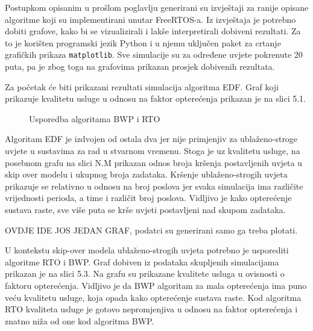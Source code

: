 \documentclass[../zavrsni.tex]{subfiles}
\begin{document}
Postupkom opisanim u prošlom poglavlju generirani su izvještaji za ranije opisane algoritme koji su implementirani unutar FreeRTOS-a.
Iz izvještaja je potrebno dobiti grafove, kako bi se vizualizirali i lakše interpretirali dobiveni rezultati. 
Za to je korišten programski jezik Python i u njemu uključen paket za crtanje grafičkih prikaza \texttt{matplotlib}. 
Sve simulacije su za određene uvjete pokrenute 20 puta, pa je zbog toga na grafovima prikazan prosjek dobivenih rezultata. 

Za početak će biti prikazani rezultati simulacija algoritma EDF. Graf koji prikazuje kvalitetu usluge u odnosu na faktor opterećenja 
prikazan je na slici 5.1. 
\begin{figure}[!htb]
    \caption{\label{fig:my-label} Usporedba algoritama BWP i RTO}
\end{figure}
Algoritam EDF je izdvojen od ostala dva jer nije primjenjiv za ublaženo-stroge
uvjete u sustavima za rad u stvarnom vremenu. Stoga je uz kvalitetu usluge, na posebnom grafu na slici N.M prikazan odnos broja kršenja 
postavljenih uvjeta u skip over modelu i ukupnog broja zadataka. Kršenje ublaženo-strogih uvjeta prikazuje se relativno u odnosu na broj 
poslova jer svaka simulacija ima različite vrijednosti perioda, a time i različit broj poslova.
Vidljivo je kako opterećenje sustava raste, sve više puta se krše uvjeti postavljeni nad 
skupom zadataka.

OVDJE IDE JOS JEDAN GRAF, podatci su generirani samo ga treba plotati.

U kontekstu skip-over modela ublaženo-strogih uvjeta potrebno je usporediti algoritme RTO i BWP. Graf dobiven iz podataka skupljenih simulacijama
prikazan je na slici 5.3. Na grafu su prikazane kvalitete usluga u ovisnosti o faktoru opterećenja. Vidljivo je da BWP algoritam za mala 
opterećenja ima puno veću kvalitetu usluge, koja opada kako opterećenje sustava raste. Kod algoritma RTO kvaliteta usluge je gotovo nepromjenjiva
u odnosu na faktor opterećenja i znatno niža od one kod algoritma BWP. 
\end{document}
